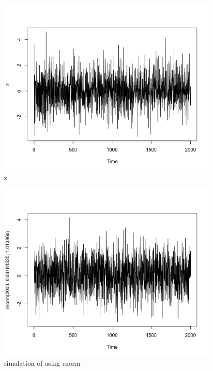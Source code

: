 \documentclass[a4paper,10pt]{article}
\begin{document}
\begin{figure}[H]
\centering
\caption{z}
\includegraphics[scale=.40]{z.png}
\end{figure}

\begin{figure}[H]
\centering
\caption{simulation of using rnorm}
\includegraphics[scale=.40]{rnorm.png}
\end{figure}
\end{document}
